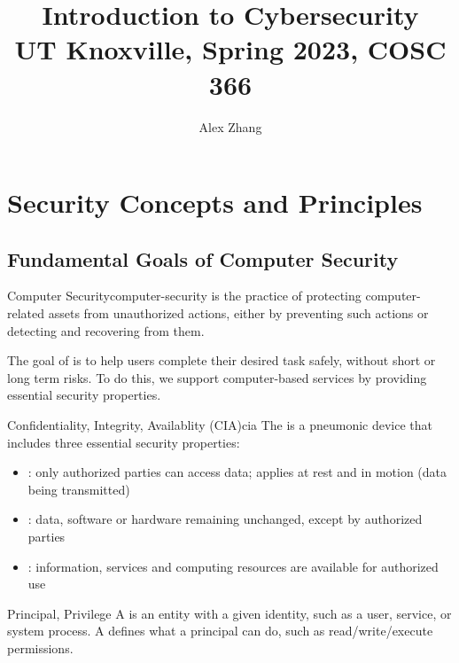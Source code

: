 \documentclass[12pt]{report}
\title{\textbf{Introduction to Cybersecurity}\\
\large UT Knoxville, Spring 2023, COSC 366}
\author{Alex Zhang}
\begin{document}
\maketitle
\tableofcontents

\chapter{Security Concepts and Principles}

\section{Fundamental Goals of Computer Security}

\begin{dfnbox}{Computer Security}{computer-security}
     is the practice of protecting computer-related assets from unauthorized actions, either by preventing such actions or detecting and recovering from them.
\end{dfnbox}

The goal of  is to help users complete their desired task safely, without short or long term risks.  To do this, we support computer-based services by providing essential security properties.

\begin{dfnbox}{Confidentiality, Integrity, Availablity (CIA)}{cia}
    The  is a pneumonic device that includes three essential security properties:
    \begin{itemize}[noitemsep]
        \item {}: only authorized parties can access data; applies at rest and in motion (data being transmitted)
        \item {}: data, software or hardware remaining unchanged, except by authorized parties
        \item {}: information, services and computing resources are available for authorized use
    \end{itemize}
\end{dfnbox}

\begin{dfnbox}{Principal, Privilege}{}
    A  is an entity with a given identity, such as a user, service, or system process. A  defines what a principal can do, such as read/write/execute permissions.
\end{dfnbox}
\end{document}
